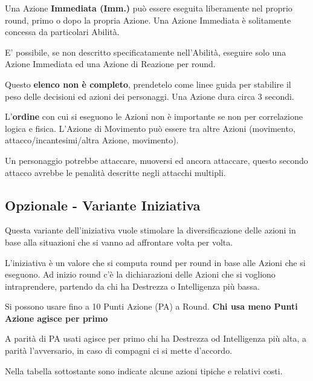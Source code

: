 \begin{multicols}{2}
Una Azione \textbf{Immediata (Imm.)} può essere eseguita liberamente nel proprio round, primo o dopo la propria Azione. Una Azione Immediata è solitamente concessa da particolari Abilità.

E' possibile, se non descritto specificatamente nell'Abilità, eseguire solo una Azione Immediata ed una Azione di Reazione per round.

\smallskip

Questo \textbf{elenco non è completo}, prendetelo come linee guida per stabilire il peso delle decisioni ed azioni dei personaggi. Una Azione dura circa 3 secondi.

L'\textbf{ordine} con cui si eseguono le Azioni non è importante se non per correlazione logica e fisica. L'Azione di Movimento può essere tra altre Azioni (movimento, attacco/incantesimi/altra Azione, movimento).

Un personaggio potrebbe attaccare, muoversi ed ancora attaccare, questo secondo attacco avrebbe le penalità descritte negli attacchi multipli.

\subsection{Opzionale - Variante Iniziativa}\hypertarget{varianteiniziativa}{}\label{varianteiniziativa}

Questa variante dell'iniziativa vuole stimolare la diversificazione delle azioni in base alla situazioni che si vanno ad affrontare volta per volta.

L'iniziativa è un valore che si computa round per round in base alle Azioni che si eseguono. Ad inizio round c'è la dichiarazioni delle Azioni che si vogliono intraprendere, partendo da chi ha Destrezza o Intelligenza più bassa.

Si possono usare fino a 10 Punti Azione (PA) a Round. \textbf{Chi usa meno Punti Azione agisce per primo}

A parità di PA usati agisce per primo chi ha Destrezza od Intelligenza più alta, a parità l'avversario, in caso di compagni ci si mette d'accordo.

Nella tabella sottostante sono indicate alcune azioni tipiche e relativi costi.

\medskip


\end{multicols}

